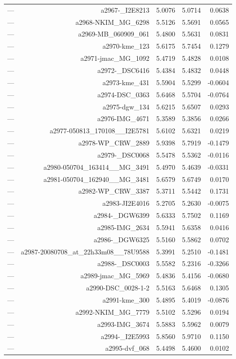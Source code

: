 \begin{table}[htbp]
\begin{tabular}{lrrrr}
— & a2967-_I2E8213 & 5.0076 & 5.0714 & 0.0638 \\
— & a2968-NKIM_MG_6298 & 5.5126 & 5.5691 & 0.0565 \\
— & a2969-MB_060909_061 & 5.4800 & 5.5631 & 0.0831 \\
— & a2970-kme_123 & 5.6175 & 5.7454 & 0.1279 \\
— & a2971-jmac_MG_1092 & 5.4719 & 5.4828 & 0.0108 \\
— & a2972-_DSC6416 & 5.4384 & 5.4832 & 0.0448 \\
— & a2973-kme_431 & 5.5904 & 5.5299 & -0.0604 \\
— & a2974-DSC_0363 & 5.6468 & 5.5704 & -0.0764 \\
— & a2975-dgw_134 & 5.6215 & 5.6507 & 0.0293 \\
— & a2976-IMG_4671 & 5.3589 & 5.3856 & 0.0266 \\
— & a2977-050813_170108__I2E5781 & 5.6102 & 5.6321 & 0.0219 \\
— & a2978-WP_CRW_2889 & 5.9398 & 5.7919 & -0.1479 \\
— & a2979-_DSC0068 & 5.5478 & 5.5362 & -0.0116 \\
— & a2980-050704_163414__MG_3491 & 5.4970 & 5.4639 & -0.0331 \\
— & a2981-050704_162940__MG_3481 & 5.6579 & 5.6749 & 0.0170 \\
— & a2982-WP_CRW_3387 & 5.3711 & 5.5442 & 0.1731 \\
— & a2983-JI2E4016 & 5.2705 & 5.2630 & -0.0075 \\
— & a2984-_DGW6399 & 5.6333 & 5.7502 & 0.1169 \\
— & a2985-IMG_2634 & 5.5941 & 5.6358 & 0.0416 \\
— & a2986-_DGW6325 & 5.5160 & 5.5862 & 0.0702 \\
— & a2987-20080708_at_22h33m08__78U9588 & 5.3991 & 5.2510 & -0.1481 \\
— & a2988-_DSC0003 & 5.5582 & 5.2316 & -0.3266 \\
— & a2989-jmac_MG_5969 & 5.4836 & 5.4156 & -0.0680 \\
— & a2990-DSC_0028-1-2 & 5.5163 & 5.6468 & 0.1305 \\
— & a2991-kme_300 & 5.4895 & 5.4019 & -0.0876 \\
— & a2992-NKIM_MG_7779 & 5.5102 & 5.5296 & 0.0194 \\
— & a2993-IMG_3674 & 5.5883 & 5.5962 & 0.0079 \\
— & a2994-_I2E5993 & 5.8560 & 5.9710 & 0.1150 \\
— & a2995-dvf_068 & 5.4498 & 5.4600 & 0.0102 \\

\end{tabular}
\end{table}
